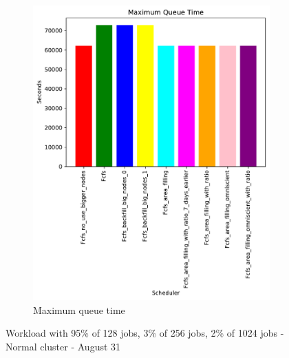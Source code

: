 \documentclass[a4paper]{article}
\begin{document}
\begin{figure}[H]
\begin{subfigure}[b]{0.4\linewidth}\centering\includegraphics[width=0.95\linewidth]{MBSS/plot/Size_Constraint_2022-01-17->2022-01-17_V9532_Maximum_queue_time_450_128_32_256_4_1024.pdf}\caption{Maximum queue time}\label{45}\end{subfigure}
\caption{Workload with 95\% of 128 jobs, 3\% of 256 jobs, 2\% of 1024 jobs - Normal cluster - August 31}\label{49}\end{figure}
\end{document}
